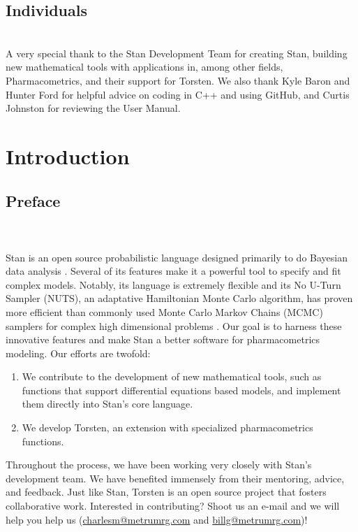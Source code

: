 \documentclass[11pt]{amsart}
\let\oldsection\section
\renewcommand\section{\clearpage\oldsection}
\begin{document}
\subsection*{Individuals} \ \\
A very special thank to the Stan Development Team for creating Stan, building new mathematical tools with applications in, among other fields, Pharmacometrics, and their support for Torsten. We also thank Kyle Baron and Hunter Ford for helpful advice on coding in C++ and using GitHub, and Curtis Johnston for reviewing the User Manual. 

\section{Introduction}

\subsection{Preface} \ \\ \ \\ Stan is an open source probabilistic language designed primarily to do Bayesian data analysis \cite{stan}. Several of its features make it a powerful tool to specify and fit complex models. Notably, its language is extremely flexible and its No U-Turn Sampler (NUTS), an adaptative Hamiltonian Monte Carlo algorithm, has proven more efficient than commonly used Monte Carlo Markov Chains (MCMC) samplers for complex high dimensional problems \cite{nuts}. Our goal is to harness these innovative features and make Stan a better software for pharmacometrics modeling. Our efforts are twofold:
\begin{enumerate}
  \item We contribute to the development of new mathematical tools, such as functions that support differential equations based models, and implement them directly into Stan's core language.
  \item We develop Torsten, an extension with specialized pharmacometrics functions.
\end{enumerate}

Throughout the process, we have been working very closely with Stan's development team. We have benefited immensely from their mentoring, advice, and feedback. Just like Stan, Torsten is an open source project that fosters collaborative work. Interested in contributing? Shoot us an e-mail and we will help you help us (\url{charlesm@metrumrg.com} and \url{billg@metrumrg.com})!
\end{document}
